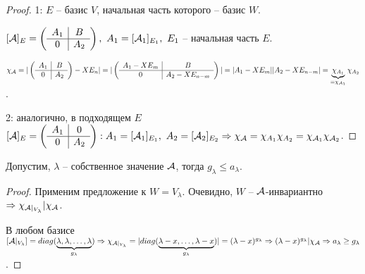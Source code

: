 \documentclass[main]{subfiles}
\begin{document}
\begin{proof}
    1: $E$ -- базис $V$, начальная часть которого -- базис $W$.

    $[\mathcal{A}]_E = \left(\begin{array}{c|c}
                A_1 & B   \\ \hline
                0   & A_2 \\
            \end{array}\right),\ A_1 = [\mathcal{A}_1]_{E_1},\ E_1$ -- начальная часть $E$.

    $\chi_{\mathcal{A} } = |\left(\begin{array}{c|c}
                A_1 & B   \\ \hline
                0   & A_2 \\
            \end{array}\right) - XE_n| = |\left(\begin{array}{c|c}
                A_1 - XE_m & B              \\ \hline
                0          & A_2 - XE_{n-m} \\
            \end{array}\right)| = |A_1 - XE_m||A_2 - XE_{n-m}| = \underbrace{\chi_{A_1}}_{=\chi_{\mathcal{A}_1}}\chi_{A_2}$.

    2: аналогично, в подходящем $E$ $[\mathcal{A}]_E = \left(\begin{array}{c|c}
                A_1 & 0   \\ \hline
                0   & A_2 \\
            \end{array}\right): A_1 = [\mathcal{A}_1]_{E_1},\  A_2 = [\mathcal{A}_2]_{E_2} \Rightarrow
        \chi_{\mathcal{A}} = \chi_{A_1}\chi_{A_2} = \chi_{\mathcal{A}_1}\chi_{\mathcal{A}_2}$.
\end{proof}

\begin{corollary}
    Допустим, $\lambda$ -- собственное значение $\mathcal{A}$, тогда $g_{\lambda} \leq a_{\lambda}$.
\end{corollary}

\begin{proof}
    Применим предложение к $W=V_{\lambda}$. Очевидно, $W$ -- $\mathcal{A}$-инвариантно
    $\Rightarrow \chi_{\mathcal{A}|_{V_{\lambda}}}|\chi_{\mathcal{A}}$.

    В любом базисе $[\mathcal{A}|_{V_{\lambda}}] = diag(\underbrace{\lambda, \lambda, \ldots, \lambda}_{g_{\lambda}})
        \Rightarrow \chi_{\mathcal{A}|_{V_{\lambda}}} = |diag(\underbrace{\lambda - x, \ldots, \lambda - x}_{g_{\lambda}})| =
        (\lambda - x)^{g_{\lambda}} \Rightarrow
        (\lambda - x)^{g_{\lambda}}|\chi_{\mathcal{A}} \Rightarrow a_{\lambda} \geq g_{\lambda}$.
\end{proof}
\end{document}
